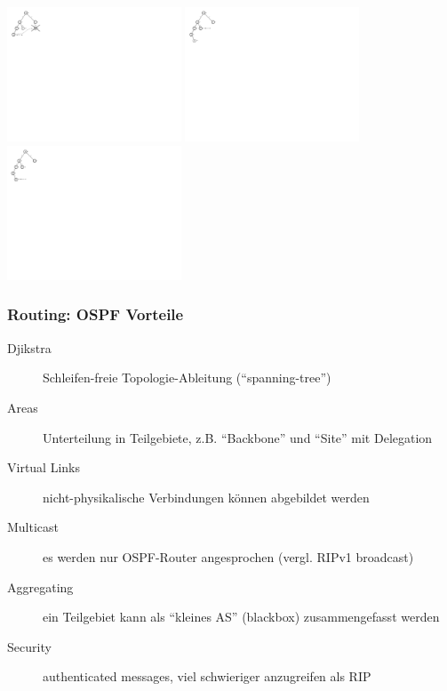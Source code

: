 \documentclass[ignorenonframetext]{beamer}
\begin{document}
\begin{frame}
	\includegraphics[height=4cm]{djikstra-tree-4}
	\includegraphics[height=4cm]{djikstra-tree-5}
	\includegraphics[height=4cm]{djikstra-tree-6}
\end{frame}



\begin{frame}
\frametitle{Routing: OSPF Vorteile}
\begin{description}
	\item[Djikstra] Schleifen-freie Topologie-Ableitung (``spanning-tree'')
	\item[Areas] Unterteilung in Teilgebiete, z.B. ``Backbone'' und ``Site'' mit Delegation
	\item[Virtual Links] nicht-physikalische Verbindungen k\"onnen abgebildet werden
	\item[Multicast] es werden nur OSPF-Router angesprochen (vergl. RIPv1 broadcast)
	\item[Aggregating] ein Teilgebiet kann als ``kleines AS'' (blackbox) zusammengefasst werden
	\item[Security] authenticated messages, viel schwieriger anzugreifen als RIP
\end{description}
\end{frame}
\end{document}
